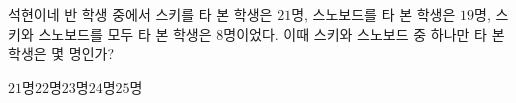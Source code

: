 석현이네 반 학생 중에서 스키를 타 본 학생은 $21$명, 스노보드를 타 본 학생은 $19$명, 스키와 스노보드를 모두 타 본 학생은 $8$명이었다. 이때 스키와 스노보드 중 하나만 타 본 학생은 몇 명인가?
\begin{choices32}{$21$명}{$22$명}{$23$명}{$24$명}{$25$명}\end{choices32}
